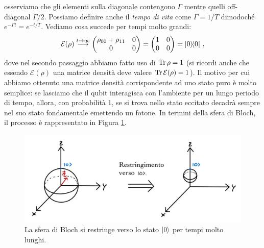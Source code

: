 osserviamo che gli elementi sulla diagonale contengono $\Gamma$ mentre quelli off-diagonal $\Gamma/2$. Possiamo definire anche il \textit{tempo di vita} come $\Gamma = 1/T$ dimodoché $e^{-\Gamma t}=e^{-t/T}$. Vediamo cosa succede per tempi molto grandi:
\begin{equation*}
    \mathcal{E}(\rho) \overset{t \to \infty}{\longrightarrow} 
    \begin{pmatrix}
        \rho_{00}+\rho_{11} & 0 \\
        0 & 0
    \end{pmatrix} =
    \begin{pmatrix}
        1 & 0 \\
        0 & 0
    \end{pmatrix}
    = \op{0}{0} \, ,
\end{equation*}
dove nel secondo passaggio abbiamo fatto uso di $\Tr \rho = 1$ (si ricordi anche che essendo $\mathcal{E}(\rho)$ una matrice densità deve valere $\Tr \mathcal{E}(\rho) = 1$). 
Il motivo per cui abbiamo ottenuto una matrice densità corrispondente ad uno stato puro è molto semplice: se lasciamo che il qubit interagisca con l'ambiente per un lungo periodo di tempo, allora, con probabilità 1, se si trova nello stato eccitato decadrà sempre nel suo stato fondamentale emettendo un fotone. In termini della sfera di Bloch, il processo è rappresentato in Figura \ref{fig:shrinking_to_0}.

\begin{figure}[!h]
    \centering
    \includegraphics[scale=0.4]{images/shrinking_to_0}
    \caption{La sfera di Bloch si restringe verso lo stato $\ket{0}$ per tempi molto lunghi.}
    \label{fig:shrinking_to_0}
\end{figure}


